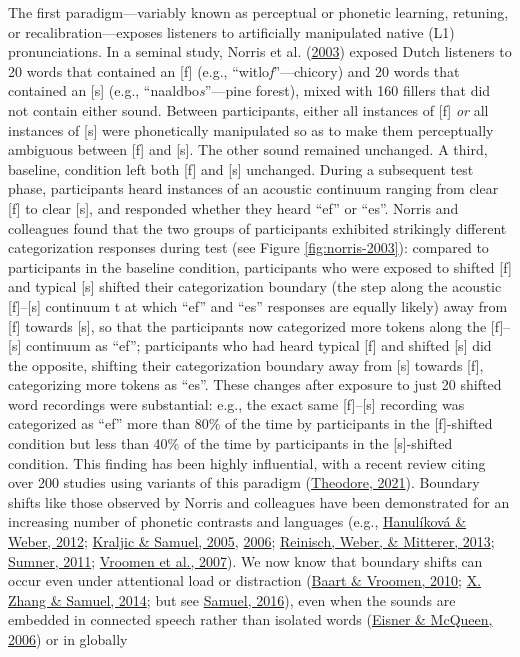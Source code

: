 \documentclass[
  11pt,
  man,floatsintext]{apa6}
\begin{document}
The first paradigm---variably known as perceptual or phonetic learning, retuning, or recalibration---exposes listeners to artificially manipulated native (L1) pronunciations. In a seminal study, Norris et al. (\protect\hyperlink{ref-norris2003}{2003}) exposed Dutch listeners to 20 words that contained an {[}f{]} (e.g., ``witlo\emph{f}''---chicory) and 20 words that contained an {[}s{]} (e.g., ``naaldbo\emph{s}''---pine forest), mixed with 160 fillers that did not contain either sound. Between participants, either all instances of {[}f{]} \emph{or} all instances of {[}s{]} were phonetically manipulated so as to make them perceptually ambiguous between {[}f{]} and {[}s{]}. The other sound remained unchanged. A third, baseline, condition left both {[}f{]} and {[}s{]} unchanged. During a subsequent test phase, participants heard instances of an acoustic continuum ranging from clear {[}f{]} to clear {[}s{]}, and responded whether they heard ``ef'' or ``es''. Norris and colleagues found that the two groups of participants exhibited strikingly different categorization responses during test (see Figure \ref{fig:norris-2003}): compared to participants in the baseline condition, participants who were exposed to shifted {[}f{]} and typical {[}s{]} shifted their categorization boundary (the step along the acoustic {[}f{]}--{[}s{]} continuum t at which ``ef'' and ``es'' responses are equally likely) away from {[}f{]} towards {[}s{]}, so that the participants now categorized more tokens along the {[}f{]}--{[}s{]} continuum as ``ef''; participants who had heard typical {[}f{]} and shifted {[}s{]} did the opposite, shifting their categorization boundary away from {[}s{]} towards {[}f{]}, categorizing more tokens as ``es''. These changes after exposure to just 20 shifted word recordings were substantial: e.g., the exact same {[}f{]}--{[}s{]} recording was categorized as ``ef'' more than 80\% of the time by participants in the {[}f{]}-shifted condition but less than 40\% of the time by participants in the {[}s{]}-shifted condition. This finding has been highly influential, with a recent review citing over 200 studies using variants of this paradigm (\protect\hyperlink{ref-theodore2021}{Theodore, 2021}). Boundary shifts like those observed by Norris and colleagues have been demonstrated for an increasing number of phonetic contrasts and languages (e.g., \protect\hyperlink{ref-hanulikova-weber2012}{Hanulíková \& Weber, 2012}; \protect\hyperlink{ref-kraljic-samuel2005}{Kraljic \& Samuel, 2005}, \protect\hyperlink{ref-kraljic-samuel2006}{2006}; \protect\hyperlink{ref-reinisch2013}{Reinisch, Weber, \& Mitterer, 2013}; \protect\hyperlink{ref-sumner2011}{Sumner, 2011}; \protect\hyperlink{ref-vroomen2007}{Vroomen et al., 2007}). We now know that boundary shifts can occur even under attentional load or distraction (\protect\hyperlink{ref-baart-vroomen2010}{Baart \& Vroomen, 2010}; \protect\hyperlink{ref-zhang-samuel2014}{X. Zhang \& Samuel, 2014}; but see \protect\hyperlink{ref-samuel2016}{Samuel, 2016}), even when the sounds are embedded in connected speech rather than isolated words (\protect\hyperlink{ref-eisner-mcqueen2006}{Eisner \& McQueen, 2006}) or in globally 
\end{document}
